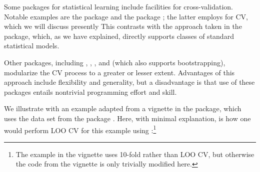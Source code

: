\documentclass[
]{jss}
\begin{document}
Some  packages for statistical learning include facilities
for cross-validation. Notable examples are the  package
\citep{Kuhn:2008} and the  package \citep{Pfitzinger:2024};
the latter employs  \citep{FrickEtAl:2024} for CV, which we
will discuss presently This contrasts with the approach taken in the
 package, which, as we have explained, directly supports classes
of standard  statistical models.

Other packages, including  \citep{OlsenZachariae:2024},
 \citep{Kapsner:2024}, 
\citep{CoyleEtAl:2022}, and  (which also supports
bootstrapping), modularize the CV process to a greater or lesser extent.
Advantages of this approach include flexibility and generality, but a
disadvantage is that use of these packages entails nontrivial
programming effort and skill.

We illustrate with an example adapted from a vignette in the
 package, which uses the  data set from the
 package \citep{Kuhn:2024}. Here, with minimal
explanation, is how one would perform LOO CV for this example using
:\footnote{The example in the  vignette uses
  10-fold rather than LOO CV, but otherwise the code from the vignette
  is only trivially modified here.}
\end{document}
